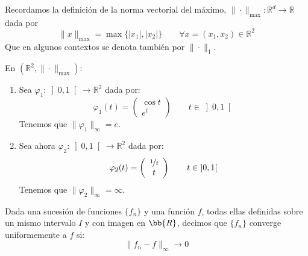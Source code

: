 \begin{definicion}
    Recordamos la definición de la norma vectorial del máximo, $\|\cdot \|_{\max}:\mathbb{R}^d\rightarrow\mathbb{R}$ dada por
    \begin{equation*}
        \|x\|_{\max} = \max\{|x_1|,|x_2|\} \qquad \forall x=(x_1,x_2)\in \mathbb{R}^2
    \end{equation*}
    Que en algunos contextos se denota también por $\|\cdot \|_1$.
\end{definicion}

\begin{ejemplo}
    En $(\mathbb{R}^2, \|\cdot \|_{\max})$:
    \begin{enumerate}
        \item Sea $\varphi_1:\left]0,1\right[\rightarrow\mathbb{R}^2$ dada por:
            \begin{equation*}
                \varphi_1(t) = \left(\begin{array}{c}
                    \cos t \\
                    e^t
                \end{array}\right) \qquad t\in \left]0,1\right[
            \end{equation*}
            Tenemos que $\|\varphi_1\|_{\infty} = e$.
        \item Sea ahora $\varphi_2:\left]0,1\right[\rightarrow\mathbb{R}^2$ dada por:
            \begin{equation*}
                \varphi_2(t) = \left(\begin{array}{c}
                        \nicefrac{1}{t} \\
                        t
                \end{array}\right) \qquad t\in \left]0,1\right[
            \end{equation*}
            Tenemos que $\|\varphi_2\|_{\infty} = \infty$.
    \end{enumerate}
\end{ejemplo}

\begin{definicion}
    Dada una sucesión de funciones $\{f_n\}$ y una función $f$, todas ellas definidas sobre un mismo intervalo $I$ y con imagen en $\bb{R}$, decimos que $\{f_n\}$ converge uniformemente a $f$ si:
    \begin{equation*}
        \|f_n - f\|_\infty \rightarrow 0
    \end{equation*}
\end{definicion}

